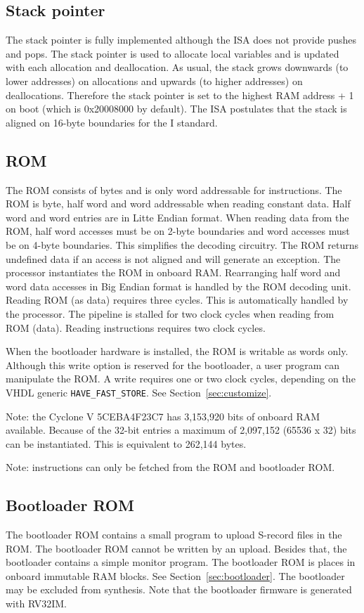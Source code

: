 \documentclass[12pt]{article}
\begin{document}
\subsection{Stack pointer}
The stack pointer is fully implemented although the ISA does not provide pushes and pops. The stack pointer is used to allocate local variables and is updated with each allocation and deallocation. As usual, the stack grows downwards (to lower addresses) on allocations and upwards (to higher addresses) on deallocations. Therefore the stack pointer is set to the highest RAM address + 1 on boot (which is 0x20008000 by default). The ISA postulates that the stack is aligned on 16-byte boundaries for the I standard.


\subsection{ROM}
\label{sec:rom}
The ROM consists of bytes and is only word addressable for instructions. The ROM is byte, half word and word addressable when reading constant data. Half word and word entries are in Litte Endian format. When reading data from the ROM, half word accesses must be on 2-byte boundaries and word accesses must be on 4-byte boundaries. This simplifies the decoding circuitry. The ROM returns undefined data if an access is not aligned and will generate an exception. The processor instantiates the ROM in onboard RAM. Rearranging half word and word data accesses in Big Endian format is handled by the ROM decoding unit. Reading ROM (as data) requires three cycles.  This is automatically handled by the processor. The pipeline is stalled for two clock cycles when reading from ROM (data). Reading instructions requires two clock cycles.

When the bootloader hardware is installed, the ROM is writable as words only. Although this write option is reserved for the bootloader,  a user program can manipulate the ROM. A write requires one or two clock cycles, depending on the VHDL generic \lstinline|HAVE_FAST_STORE|. See Section~\ref{sec:customize}.

Note: the Cyclone V 5CEBA4F23C7 has 3,153,920 bits of onboard RAM available. Because of the 32-bit entries a maximum of 2,097,152 (65536 x 32) bits can be instantiated. This is equivalent to 262,144 bytes.

Note: instructions can only be fetched from the ROM and bootloader ROM.

\subsection{Bootloader ROM}
\label{sec:bootloaderrom}
The bootloader ROM contains a small program to upload S-record files in the ROM. The bootloader ROM cannot be written by an upload. Besides that, the bootloader contains a simple monitor program. The bootloader ROM is places in onboard immutable RAM blocks. See Section~\ref{sec:bootloader}. The bootloader may be excluded from synthesis. Note that the bootloader firmware is generated with RV32IM.
\end{document}
